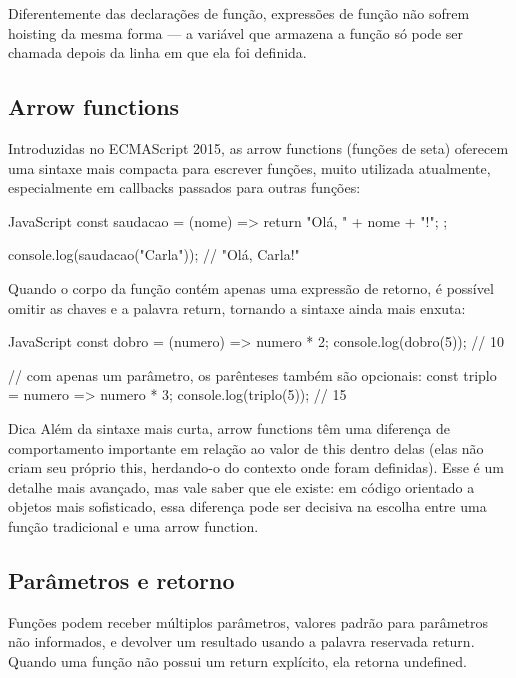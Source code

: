 Diferentemente das declarações de função, expressões de função não sofrem hoisting da mesma forma — a variável que armazena a função só pode ser chamada depois da linha em que ela foi definida.

\subsection{Arrow functions}

Introduzidas no ECMAScript 2015, as arrow functions (funções de seta) oferecem uma sintaxe mais compacta para escrever funções, muito utilizada atualmente, especialmente em callbacks passados para outras funções:

\begin{codebox}{JavaScript}
const saudacao = (nome) => {
   return "Olá, " + nome + "!";
};

console.log(saudacao("Carla")); // "Olá, Carla!"
\end{codebox}

Quando o corpo da função contém apenas uma expressão de retorno, é possível omitir as chaves e a palavra return, tornando a sintaxe ainda mais enxuta:

\begin{codebox}{JavaScript}
const dobro = (numero) => numero * 2;
console.log(dobro(5)); // 10

// com apenas um parâmetro, os parênteses também são opcionais:
const triplo = numero => numero * 3;
console.log(triplo(5)); // 15
\end{codebox}

\begin{infobox}{Dica}
Além da sintaxe mais curta, arrow functions têm uma diferença de comportamento importante em relação ao valor de this dentro delas (elas não criam seu próprio this, herdando-o do contexto onde foram definidas). Esse é um detalhe mais avançado, mas vale saber que ele existe: em código orientado a objetos mais sofisticado, essa diferença pode ser decisiva na escolha entre uma função tradicional e uma arrow function.
\end{infobox}

\subsection{Parâmetros e retorno}

Funções podem receber múltiplos parâmetros, valores padrão para parâmetros não informados, e devolver um resultado usando a palavra reservada return. Quando uma função não possui um return explícito, ela retorna undefined.

